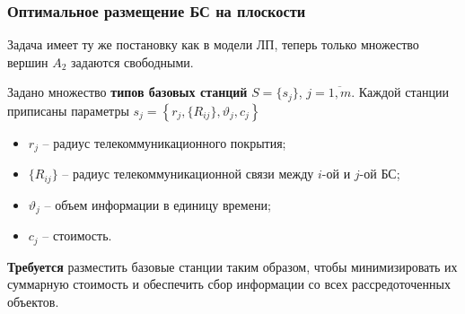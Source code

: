\begin{frame}
    \frametitle{Оптимальное размещение БС на плоскости}
    \justifying

    Задача имеет ту же постановку как в модели ЛП, теперь  только множество вершин $A_2$ задаются свободными. 

    \bigskip
    
    Задано множество \textbf{типов базовых станций} $S = \{s_j\}$, $j=\overline{1,m}$. Каждой станции приписаны параметры $s_j = \left\{r_j, \{R_{ij}\}, \vartheta_j, c_j \right\}$
    \begin{itemize}
        \item $r_j$ -- радиус телекоммуникационного покрытия;
        \item $\{R_{ij}\}$ -- радиус телекоммуникационной связи между $i$-ой и $j$-ой БС;
        \item $\vartheta_j$ -- объем информации в единицу времени;
        \item $c_j$ -- стоимость.
    \end{itemize}
    

    \bigskip
    \textbf{Требуется} разместить базовые станции таким образом, чтобы минимизировать их суммарную стоимость и обеспечить сбор информации со всех рассредоточенных объектов.

\end{frame}

